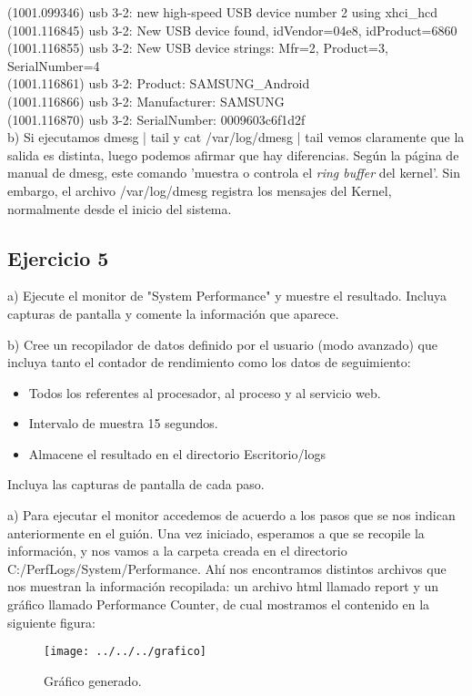 \documentclass[a4paper, 11pt]{article} %
\begin{document}
(1001.099346) usb 3-2: new high-speed USB device number 2 using xhci\_hcd\\
(1001.116845) usb 3-2: New USB device found, idVendor=04e8, idProduct=6860\\
(1001.116855) usb 3-2: New USB device strings: Mfr=2, Product=3, SerialNumber=4\\
(1001.116861) usb 3-2: Product: SAMSUNG\_Android\\
(1001.116866) usb 3-2: Manufacturer: SAMSUNG\\
(1001.116870) usb 3-2: SerialNumber: 0009603c6f1d2f\\


b) Si ejecutamos dmesg | tail y cat /var/log/dmesg | tail vemos claramente que la salida es distinta, luego podemos afirmar que hay diferencias. Según la página de manual de dmesg, este comando 'muestra o controla el \textit{ring buffer} del kernel'. Sin embargo, el archivo /var/log/dmesg registra los mensajes del Kernel, normalmente desde el inicio del sistema.

\subsection{Ejercicio 5}
a) Ejecute el monitor de "System Performance" y muestre el resultado. Incluya capturas de pantalla y comente la información que aparece. 

b) Cree un recopilador de datos definido por el usuario (modo avanzado) que incluya tanto el contador de rendimiento como los datos de seguimiento: 
\begin{itemize}
\item Todos los referentes al procesador, al proceso y al servicio web. 
\item Intervalo de muestra 15 segundos.
\item Almacene el resultado en el directorio Escritorio/logs
\end{itemize}
Incluya las capturas de pantalla de cada paso. 

a) Para ejecutar el monitor accedemos de acuerdo a los pasos que se nos indican anteriormente en el guión. Una vez iniciado, esperamos a que se recopile la información, y nos vamos a la carpeta creada en el directorio C:/PerfLogs/System/Performance. Ahí nos encontramos distintos archivos que nos muestran la información recopilada: un archivo html llamado report y un gráfico llamado Performance Counter, de cual mostramos el contenido en la siguiente figura: 
\pagebreak
\begin{figure}[htpb]
\centering
\texttt{[image: ../../../grafico]}
\caption{Gráfico generado.}
\end{figure}
\end{document}
